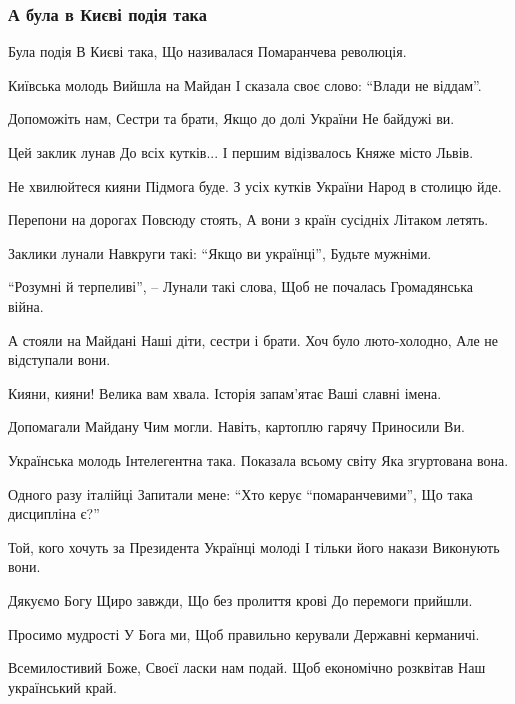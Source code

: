 
 
 

\subsubsection{А була в Києві подія така}

Була подія
В Києві така,
Що називалася
Помаранчева революція.

Київська молодь
Вийшла на Майдан
І сказала своє слово:
“Влади не віддам”.

Допоможіть нам,
Сестри та брати,
Якщо до долі України
Не байдужі ви.

Цей заклик лунав
До всіх кутків...
І першим відізвалось
Княже місто Львів.

Не хвилюйтеся кияни
Підмога буде.
З усіх кутків України
Народ в столицю йде.

Перепони на дорогах
Повсюду стоять,
А вони з країн сусідніх
Літаком летять.

Заклики лунали
Навкруги такі:
“Якщо ви українці”,
Будьте мужніми.

“Розумні й терпеливі”, –
Лунали такі слова,
Щоб не почалась
Громадянська війна.

А стояли на Майдані
Наші діти, сестри і брати.
Хоч було люто-холодно,
Але не відступали вони.

Кияни, кияни!
Велика вам хвала.
Історія запам’ятає
Ваші славні імена.

Допомагали Майдану
Чим могли.
Навіть, картоплю гарячу
Приносили Ви.

Українська молодь
Інтелегентна така.
Показала всьому світу
Яка згуртована вона.

Одного разу італійці
Запитали мене:
“Хто керує “помаранчевими”,
Що така дисципліна є?”

Той, кого хочуть за Президента
Українці молоді
І тільки його накази
Виконують вони.

Дякуємо Богу
Щиро завжди,
Що без пролиття крові
До перемоги прийшли.

Просимо мудрості
У Бога ми,
Щоб правильно керували
Державні керманичі.

Всемилостивий Боже,
Своєї ласки нам подай.
Щоб економічно розквітав
Наш український край. 
